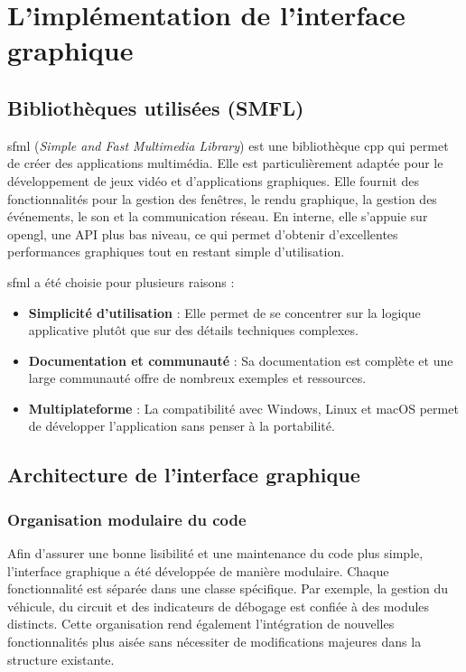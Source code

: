 \section{L'implémentation de l'interface graphique}\label{sec:l'implementation-de-l-interface-graphique}
\subsection{Bibliothèques utilisées (SMFL)}\label{subsec:sfml}
\gls{sfml} (\textit{Simple and Fast Multimedia Library}) est une bibliothèque \gls{cpp} qui permet de créer des applications multimédia.
Elle est particulièrement adaptée pour le développement de jeux vidéo et d'applications graphiques.
Elle fournit des fonctionnalités pour la gestion des fenêtres, le rendu graphique, la gestion des événements, le son et la communication réseau.
En interne, elle s'appuie sur \gls{opengl}, une API plus bas niveau, ce qui permet d'obtenir d'excellentes performances graphiques tout en restant simple d'utilisation.

\gls{sfml} a été choisie pour plusieurs raisons :
\begin{itemize}
    \item \textbf{Simplicité d'utilisation} : Elle permet de se concentrer sur la logique applicative plutôt que sur des détails techniques complexes.
    \item \textbf{Documentation et communauté} : Sa documentation\cite{documentationSFML} est complète et une large communauté offre de nombreux exemples et ressources.
    \item \textbf{Multiplateforme} : La compatibilité avec Windows, Linux et macOS permet de développer l'application sans penser à la portabilité.
\end{itemize}

\subsection{Architecture de l'interface graphique}\label{subsec:architecture-de-l-interface-graphique} %
\subsubsection{Organisation modulaire du code}\label{subsubsec:organisation-modulaire-du-code}
Afin d'assurer une bonne lisibilité et une maintenance du code plus simple, l'interface graphique a été développée de manière modulaire.
Chaque fonctionnalité est séparée dans une classe spécifique.
Par exemple, la gestion du véhicule, du circuit et des indicateurs de débogage est confiée à des modules distincts.
Cette organisation rend également l'intégration de nouvelles fonctionnalités plus aisée sans nécessiter de modifications majeures dans la structure existante.

